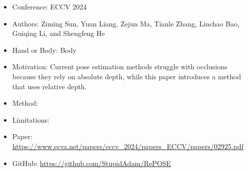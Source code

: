 \documentclass{article}
\begin{document}
\begin{itemize}
    \item Conference: ECCV 2024
    \item Authors: Ziming Sun, Yuan Liang, Zejun Ma, Tianle Zhang, Linchao Bao, Guiqing Li, and Shengfeng He
    \item Hand or Body: Body
    \item Motivation: Current pose estimation methods struggle with occlusions because they rely on absolute depth, while this paper introduces a method that uses relative depth.
    \item Method:
    \item Limitations:
    \item Paper: \url{https://www.ecva.net/papers/eccv_2024/papers_ECCV/papers/02925.pdf}
    \item GitHub: \url{https://github.com/StupidAdam/RePOSE}
\end{itemize}
\end{document}
